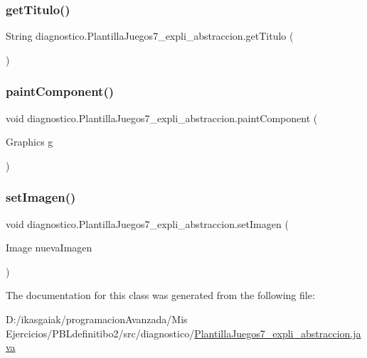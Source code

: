 \subsubsection{\texorpdfstring{get\+Titulo()}{getTitulo()}}
{\footnotesize\ttfamily String diagnostico.\+Plantilla\+Juegos7\+\_\+expli\+\_\+abstraccion.\+get\+Titulo (\begin{DoxyParamCaption}{ }\end{DoxyParamCaption})}

\mbox{\label{classdiagnostico_1_1_plantilla_juegos7__expli__abstraccion_ae5606769f16fa47e3fb16e98e1117cf4}} 
\subsubsection{\texorpdfstring{paint\+Component()}{paintComponent()}}
{\footnotesize\ttfamily void diagnostico.\+Plantilla\+Juegos7\+\_\+expli\+\_\+abstraccion.\+paint\+Component (\begin{DoxyParamCaption}\item[{Graphics}]{g }\end{DoxyParamCaption})\hspace{0.3cm}{\ttfamily [protected]}}

\mbox{\label{classdiagnostico_1_1_plantilla_juegos7__expli__abstraccion_a3fbb8660098f67c420c80e7465dbc312}} 
\subsubsection{\texorpdfstring{set\+Imagen()}{setImagen()}}
{\footnotesize\ttfamily void diagnostico.\+Plantilla\+Juegos7\+\_\+expli\+\_\+abstraccion.\+set\+Imagen (\begin{DoxyParamCaption}\item[{Image}]{nueva\+Imagen }\end{DoxyParamCaption})}



The documentation for this class was generated from the following file\+:\begin{DoxyCompactItemize}
\item 
D\+:/ikasgaiak/programacion\+Avanzada/\+Mis Ejercicios/\+P\+B\+Ldefinitibo2/src/diagnostico/\mbox{\hyperlink{_plantilla_juegos7__expli__abstraccion_8java}{Plantilla\+Juegos7\+\_\+expli\+\_\+abstraccion.\+java}}\end{DoxyCompactItemize}
